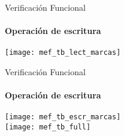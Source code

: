\begin{frame}{Verificación Funcional}
		\framesubtitle{Operación de escritura}
		\centering
		\texttt{[image: mef\_tb\_lect\_marcas]}
\end{frame}
\begin{frame}{Verificación Funcional}
	\framesubtitle{Operación de escritura}
	\centering
		\texttt{[image: mef\_tb\_escr\_marcas]}\\
		\vfill
		\texttt{[image: mef\_tb\_full]}
\end{frame}

%			
%			
%			
%			
%			
%			
%					
%					
%					
